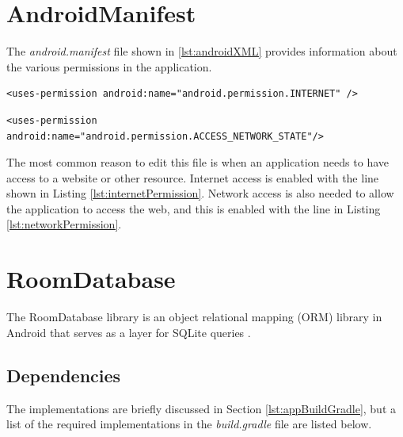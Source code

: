 \documentclass[12pt]{article}
\begin{document}
\newpage
\section{AndroidManifest}

The \textit{android.manifest} file shown in \ref{lst:androidXML} provides information about the various permissions in the application. 

\begin{lstlisting}[numbers=none, 
			caption=Line to give permission to allow internet access,
			label={lst:internetPermission}]
<uses-permission android:name="android.permission.INTERNET" />
\end{lstlisting}

\begin{lstlisting}[numbers=none, 
			caption=Line to give permission to allow network access,
			label={lst:networkPermission}]
<uses-permission android:name="android.permission.ACCESS_NETWORK_STATE"/>
\end{lstlisting}
The most common reason to edit this file is when an application needs to have access to a website or other resource. Internet access is enabled with the line shown in Listing \ref{lst:internetPermission}.
Network access is also needed to allow the application to access the web, and this is enabled with the line in Listing \ref{lst:networkPermission}.


\newpage

\section{RoomDatabase}
The RoomDatabase library is an object relational mapping (ORM) library in Android that serves as a layer for SQLite queries \cite{GoogleRoomDB} .
\subsection{Dependencies}
The implementations are briefly discussed in Section \ref{lst:appBuildGradle}, but a list of the required implementations in the \textit{build.gradle} file are listed below. 
\end{document}
